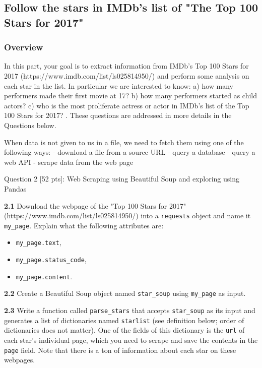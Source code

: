 \documentclass[11pt]{article}
\providecommand{\tightlist}{%
      \setlength{\itemsep}{0pt}\setlength{\parskip}{0pt}}
\begin{document}
    \subsection{Follow the stars in IMDb's list of "The Top 100 Stars for
2017"}\label{follow-the-stars-in-imdbs-list-of-the-top-100-stars-for-2017}

\subsubsection{Overview}\label{overview}

In this part, your goal is to extract information from IMDb's Top 100
Stars for 2017 (https://www.imdb.com/list/ls025814950/) and perform some
analysis on each star in the list. In particular we are interested to
know: a) how many performers made their first movie at 17? b) how many
performers started as child actors? c) who is the most proliferate
actress or actor in IMDb's list of the Top 100 Stars for 2017? . These
questions are addressed in more details in the Questions below.

When data is not given to us in a file, we need to fetch them using one
of the following ways: - download a file from a source URL - query a
database - query a web API - scrape data from the web page

     Question 2 {[}52 pts{]}: Web Scraping using Beautiful Soup and
exploring using Pandas

\textbf{2.1} Download the webpage of the "Top 100 Stars for 2017"
(https://www.imdb.com/list/ls025814950/) into a \texttt{requests} object
and name it \texttt{my\_page}. Explain what the following attributes
are:

\begin{itemize}
\tightlist
\item
  \texttt{my\_page.text},
\item
  \texttt{my\_page.status\_code},
\item
  \texttt{my\_page.content}.
\end{itemize}

\textbf{2.2} Create a Beautiful Soup object named \texttt{star\_soup}
using \texttt{my\_page} as input.

\textbf{2.3} Write a function called \texttt{parse\_stars} that accepts
\texttt{star\_soup} as its input and generates a list of dictionaries
named \texttt{starlist} (see definition below; order of dictionaries
does not matter). One of the fields of this dictionary is the
\texttt{url} of each star's individual page, which you need to scrape
and save the contents in the \texttt{page} field. Note that there is a
ton of information about each star on these webpages.
\end{document}
